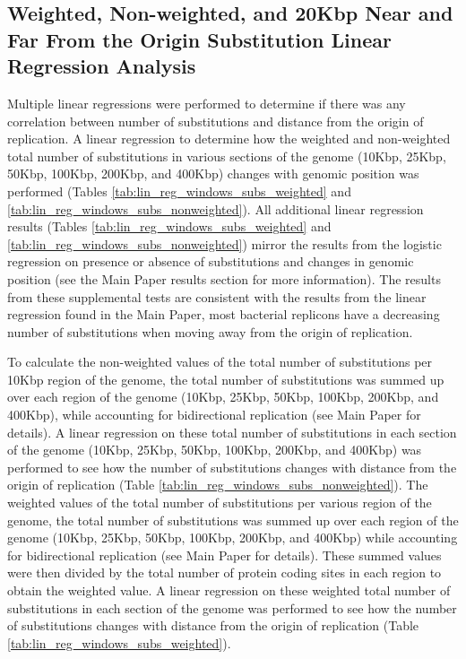 \documentclass[11pt]{article}
\begin{document}
\subsection{Weighted, Non-weighted, and 20Kbp Near and Far From the Origin Substitution Linear Regression Analysis}
Multiple linear regressions were performed to determine if there was any correlation between number of substitutions and distance from the origin of replication.
A linear regression to determine how the weighted and non-weighted total number of substitutions in various sections of the genome (10Kbp, 25Kbp, 50Kbp, 100Kbp, 200Kbp, and 400Kbp) changes with genomic position was performed  (Tables \ref{tab:lin_reg_windows_subs_weighted} and \ref{tab:lin_reg_windows_subs_nonweighted}).
All additional linear regression results (Tables \ref{tab:lin_reg_windows_subs_weighted} and \ref{tab:lin_reg_windows_subs_nonweighted}) mirror the results from the logistic regression on presence or absence of substitutions and changes in genomic position (see the Main Paper results section for more information).
The results from these supplemental tests are consistent with the results from the linear regression found in the Main Paper, most bacterial replicons have a decreasing number of substitutions when moving away from the origin of replication.

To calculate the non-weighted values of the total number of substitutions per 10Kbp region of the genome, the total number of substitutions was summed up over each region of the genome (10Kbp, 25Kbp, 50Kbp, 100Kbp, 200Kbp, and 400Kbp), while accounting for bidirectional replication (see Main Paper for details).
A linear regression on these total number of substitutions in each section of the genome (10Kbp, 25Kbp, 50Kbp, 100Kbp, 200Kbp, and 400Kbp) was performed to see how the number of substitutions changes with distance from the origin of replication (Table \ref{tab:lin_reg_windows_subs_nonweighted}).
The weighted values of the total number of substitutions per various region of the genome, the total number of substitutions was summed up over each region of the genome (10Kbp, 25Kbp, 50Kbp, 100Kbp, 200Kbp, and 400Kbp) while accounting for bidirectional replication (see Main Paper for details).
These summed values were then divided by the total number of protein coding sites in each region to obtain the weighted value.
A linear regression on these weighted total number of substitutions in each section of the genome was performed to see how the number of substitutions changes with distance from the origin of replication (Table \ref{tab:lin_reg_windows_subs_weighted}).
\end{document}
